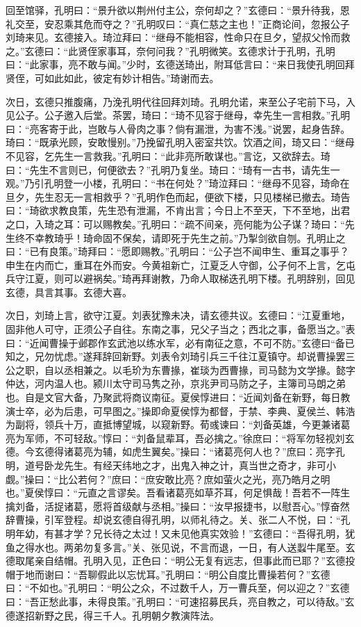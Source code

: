 回至馆驿，孔明曰：“景升欲以荆州付主公，奈何却之？”玄德曰：“景升待我，恩礼交至，安忍乘其危而夺之？”孔明叹曰：“真仁慈之主也！”正商论间，忽报公子刘琦来见。玄德接入。琦泣拜曰：“继母不能相容，性命只在旦夕，望叔父怜而救之。”玄德曰：“此贤侄家事耳，奈何问我？”孔明微笑。玄德求计于孔明，孔明曰：“此家事，亮不敢与闻。”少时，玄德送琦出，附耳低言曰：“来日我使孔明回拜贤侄，可如此如此，彼定有妙计相告。”琦谢而去。

次日，玄德只推腹痛，乃浼孔明代往回拜刘琦。孔明允诺，来至公子宅前下马，入见公子。公子邀入后堂。茶罢，琦曰：“琦不见容于继母，幸先生一言相救。”孔明曰：“亮客寄于此，岂敢与人骨肉之事？倘有漏泄，为害不浅。”说罢，起身告辞。琦曰：“既承光顾，安敢慢别。”乃挽留孔明入密室共饮。饮酒之间，琦又曰：“继母不见容，乞先生一言救我。”孔明曰：“此非亮所敢谋也。”言讫，又欲辞去。琦曰：“先生不言则已，何便欲去？”孔明乃复坐。琦曰：“琦有一古书，请先生一观。”乃引孔明登一小楼，孔明曰：“书在何处？”琦泣拜曰：“继母不见容，琦命在旦夕，先生忍无一言相救乎？”孔明作色而起，便欲下楼，只见楼梯已撤去。琦告曰：“琦欲求教良策，先生恐有泄漏，不肯出言；今日上不至天，下不至地，出君之口，入琦之耳：可以赐教矣。”孔明曰：“疏不间亲，亮何能为公子谋？琦曰：“先生终不幸教琦乎！琦命固不保矣，请即死于先生之前。”乃掣剑欲自刎。孔明止之曰：“已有良策。”琦拜曰：“愿即赐教。”孔明曰：“公子岂不闻申生、重耳之事乎？申生在内而亡，重耳在外而安。今黄祖新亡，江夏乏人守御，公子何不上言，乞屯兵守江夏，则可以避祸矣。”琦再拜谢教，乃命人取梯迭孔明下楼。孔明辞别，回见玄德，具言其事。玄德大喜。

次日，刘琦上言，欲守江夏。刘表犹豫未决，请玄德共议。玄德曰：“江夏重地，固非他人可守，正须公子自往。东南之事，兄父子当之；西北之事，备愿当之。”表曰：“近闻曹操于邺郡作玄武池以练水军，必有南征之意，不可不防。”玄德曰“备已知之，兄勿忧虑。”遂拜辞回新野。刘表令刘琦引兵三千往江夏镇守。却说曹操罢三公之职，自以丞相兼之。以毛玠为东曹掾，崔琰为西曹掾，司马懿为文学掾。懿字仲达，河内温人也。颍川太守司马隽之孙，京兆尹司马防之子，主簿司马朗之弟也。自是文官大备，乃聚武将商议南征。夏侯惇进曰：“近闻刘备在新野，每日教演士卒，必为后患，可早图之。”操即命夏侯惇为都督，于禁、李典、夏侯兰、韩浩为副将，领兵十万，直抵博望城，以窥新野。荀彧谏曰：“刘备英雄，今更兼诸葛亮为军师，不可轻敌。”惇曰：“刘备鼠辈耳，吾必擒之。”徐庶曰：“将军勿轻视刘玄德。今玄德得诸葛亮为辅，如虎生翼矣。”操曰：“诸葛亮何人也？”庶曰：亮字孔明，道号卧龙先生。有经天纬地之才，出鬼入神之计，真当世之奇才，非可小觑。”操曰：“比公若何？”庶曰：“庶安敢比亮？庶如萤火之光，亮乃皓月之明也。”夏侯惇曰：“元直之言谬矣。吾看诸葛亮如草芥耳，何足惧哉！吾若不一阵生擒刘备，活捉诸葛，愿将首级献与丞相。”操曰：“汝早报捷书，以慰吾心。”惇奋然辞曹操，引军登程。却说玄德自得孔明，以师礼待之。关、张二人不悦，曰：“孔明年幼，有甚才学？兄长待之太过！又未见他真实效验！”玄德曰：“吾得孔明，犹鱼之得水也。两弟勿复多言。”关、张见说，不言而退，一日，有人送蠫牛尾至。玄德取尾亲自结帽。孔明入见，正色曰：“明公无复有远志，但事此而已耶？”玄德投帽于地而谢曰：“吾聊假此以忘忧耳。”孔明曰：“明公自度比曹操若何？”玄德曰：“不如也。”孔明曰：“明公之众，不过数千人，万一曹兵至，何以迎之？”玄德曰：“吾正愁此事，未得良策。”孔明曰：“可速招募民兵，亮自教之，可以待敌。”玄德遂招新野之民，得三千人。孔明朝夕教演阵法。

